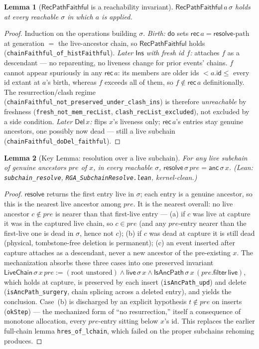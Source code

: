 \documentclass[11pt]{article}
\newtheorem{lemma}{Lemma}
\theoremstyle{definition}
\theoremstyle{remark}
\newcommand{\st}{\sigma}
\newcommand{\dodo}{\mathsf{do}}
\newcommand{\resolve}{\mathsf{resolve}}
\newcommand{\anc}{\mathsf{anc}}
\newcommand{\contains}{\mathsf{live}}
\newcommand{\recList}{\mathsf{rec}}
\newcommand{\RVF}{\textsf{RecPathFaithful}}
\newcommand{\lean}[1]{\texttt{#1}}
\begin{document}
\begin{lemma}[$\RVF$ is a reachability invariant]\label{lem:rvf}
$\RVF\,a\,\st$ holds at every reachable $\st$ in which $a$ is applied.
\end{lemma}
\begin{proof}
Induction on the operations building $\st$. \emph{Birth:} $\dodo$ sets
$\recList\,a = \resolve\text{-path}$ at generation $=$ the live-ancestor chain, so $\RVF$
holds (\lean{chainFaithful\_of\_histFaithful}). \emph{Later $\mathsf{Ins}$ with fresh id
$f$:} attaches $f$ as a descendant --- no reparenting, no liveness change for prior events'
chains. $f$ cannot appear spuriously in any $\recList\,a$: its members are older ids
$< a.\mathsf{id} \le$ every id extant at $a$'s birth, whereas $f$ exceeds all of them, so
$f \notin \recList\,a$ definitionally. The resurrection/clash regime
(\lean{chainFaithful\_not\_preserved\_under\_clash\_ins}) is therefore \emph{unreachable} by
freshness (\lean{fresh\_not\_mem\_recList}, \lean{clash\_recList\_excluded}), not excluded by
a side condition. \emph{Later $\mathsf{Del}\,x$:} flips $x$'s liveness only; $\recList\,a$'s
entries stay genuine ancestors, one possibly now dead --- still a live subchain
(\lean{chainFaithful\_doDel\_faithful}).
\end{proof}

\begin{lemma}[Key Lemma: resolution over a live subchain]\label{lem:key}
For any live subchain of genuine ancestors $pre$ of $x$, in every reachable $\st$,
$\resolve\,\st\,pre = \anc\,\st\,x$. (Lean: \lean{subchain\_resolve},
\lean{RGA\_SubchainResolve.lean}, kernel-clean.)
\end{lemma}
\begin{proof}
$\resolve$ returns the first entry live in $\st$; each entry is a genuine ancestor, so this is
the nearest live ancestor among $pre$. It is the nearest overall: no live ancestor $c \notin
pre$ is nearer than that first-live entry --- (a) if $c$ was live at capture it was in the
captured live chain, so $c \in pre$ (and any $pre$-entry nearer than the first-live one is
dead in $\st$, hence not $c$); (b) if $c$ was dead at capture it is still dead (physical,
tombstone-free deletion is permanent); (c) an event inserted after capture attaches as a
descendant, never a new ancestor of the pre-existing $x$. The mechanization absorbs these
three cases into one preserved invariant
$\mathsf{LiveChain}\,\st\,x\,pre := (\text{root unstored}) \wedge \contains\,\st\,x \wedge
\mathsf{IsAncPath}\,\st\,x\,(pre.\mathsf{filter}\,\contains)$, which holds at capture, is
preserved by each insert (\lean{isAncPath\_upd}) and delete (\lean{isAncPath\_surgery}, chain
splicing across a deleted entry), and yields the conclusion. Case~(b) is discharged by an
explicit hypothesis $t \notin pre$ on inserts (\lean{okStep}) --- the mechanized form of ``no
resurrection,'' itself a consequence of monotone allocation, every $pre$-entry sitting below
$x$'s id. This replaces the earlier full-chain lemma \lean{hres\_of\_lchain}, which failed on
the proper subchains rehoming produces.
\end{proof}
\end{document}
